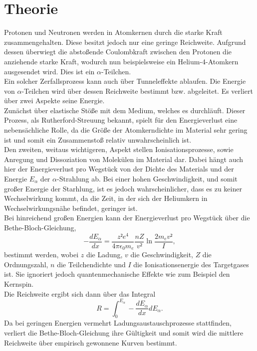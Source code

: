 \section{Theorie}
\label{sec:Theorie}

Protonen und Neutronen werden in Atomkernen durch die starke Kraft zusammengehalten.
Diese besitzt jedoch nur eine geringe Reichweite.
Aufgrund dessen überwiegt die abstoßende Coulombkraft zwischen den Protonen die anziehende starke Kraft, wodurch nun beispielsweise ein Helium-4-Atomkern ausgesendet wird.
Dies ist ein $\alpha$-Teilchen.\\
Ein solcher Zerfallsprozess kann auch über Tunneleffekte ablaufen.
Die Energie von $\alpha$-Teilchen wird über dessen Reichweite bestimmt bzw. abgeleitet.
Es verliert über zwei Aspekte seine Energie.\\
Zunächst über elastische Stöße mit dem Medium, welches es durchläuft.
Dieser Prozess, als Rutherford-Streuung bekannt, spielt für den Energieverlust eine nebensächliche Rolle, da die Größe der Atomkerndichte im Material sehr gering ist und somit ein Zusammenstoß relativ unwahrscheinlich ist.\\
Den zweiten, weitaus wichtigeren, Aspekt stellen Ionisationsprozesse, sowie Anregung und Dissoziation von Molekülen im Material dar.
Dabei hängt auch hier der Energieverlust pro Wegstück von der Dichte des Materials und der Energie $E_{\alpha}$ der $\alpha$-Strahlung ab.
Bei einer hohen Geschwindigkeit, und somit großer Energie der Starhlung, ist es jedoch wahrscheinlicher, dass es zu keiner Wechselwirkung kommt, da die Zeit, in der sich der Heliumkern in Wechselwirkungsnähe befindet, geringer ist.\\
Bei hinreichend großen Energien kann der Energieverlust pro Wegstück über die Bethe-Bloch-Gleichung,
\begin{equation}
  -\frac{dE_{\alpha}}{dx} = \frac{z²e^4}{4 \pi \epsilon_0 m_e} \frac{nZ}{v²} \ln{\frac{2m_e v²}{I}},
\end{equation}
bestimmt werden, wobei $z$ die Ladung, $v$ die Geschwindigkeit, $Z$ die Ordnungszahl, $n$ die Teilchendichte und $I$ die Ionisationsenergie des Targetgases ist.
Sie ignoriert jedoch quantenmechanische Effekte wie zum Beispiel den Kernspin.\\
Die Reichweite ergibt sich dann über das Integral
\begin{equation}
  R = \int_0^{E_{\alpha}} -\frac{dE_{\alpha}}{dx} dE_{\alpha}.
\end{equation}
Da bei geringen Energien vermehrt Ladungsaustauschprozesse stattfinden, verliert die Bethe-Bloch-Gleichung ihre Gültigkeit und somit wird die mittlere Reichweite über empirisch gewonnene Kurven bestimmt.
